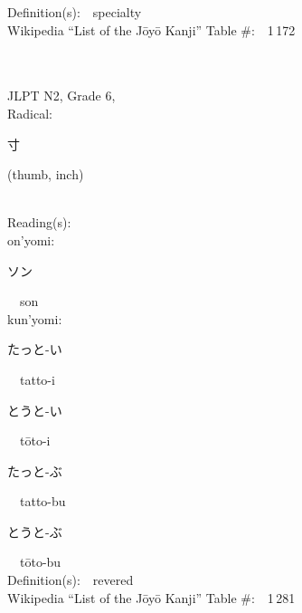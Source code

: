 \begin{multicols}{2}
Definition(s):\ \ specialty \\
Wikipedia ``List of the J\=oy\=o Kanji'' Table \#:\ \ 1\,172 \\
\ \ \\
{\fontsize{34pt}{40pt}  }\ \ \\  %
{JLPT N2, Grade 6, \\Radical:\ \ {\begin{CJK}{UTF8}{min} 寸 \end{CJK}} (thumb, inch) } \\
Reading(s):\ \ \\
{\hspace*{1em}}on'yomi:\ \ \\
{\hspace*{2em}}{\begin{CJK}{UTF8}{min} ソン \end{CJK}}\ \ son\ \ \\
{\hspace*{1em}}kun'yomi:\ \ \\
{\hspace*{2em}}{\begin{CJK}{UTF8}{min} たっと-い \end{CJK}}\ \ tatto-i\ \ \\
{\hspace*{2em}}{\begin{CJK}{UTF8}{min} とうと-い \end{CJK}}\ \ t\=oto-i\ \ \\
{\hspace*{2em}}{\begin{CJK}{UTF8}{min} たっと-ぶ \end{CJK}}\ \ tatto-bu\ \ \\
{\hspace*{2em}}{\begin{CJK}{UTF8}{min} とうと-ぶ \end{CJK}}\ \ t\=oto-bu\ \ \\
Definition(s):\ \ revered \\
Wikipedia ``List of the J\=oy\=o Kanji'' Table \#:\ \ 1\,281 \\
\ \ \\
{\fontsize{34pt}{40pt}  }\ \ \\  %

\end{multicols}
